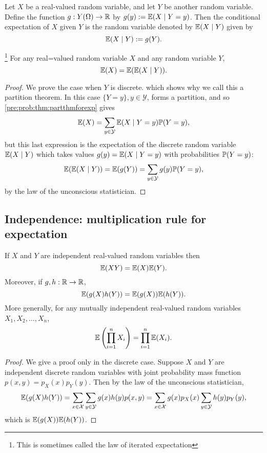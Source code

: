 \documentclass[10pt, a4paper]{article}
\begin{document}
\begin{definition}
    Let $X$ be a real-valued random variable,
    and let $Y$ be another random variable.
    Define the function $g : Y(\Omega) \rightarrow \R$ by $g(y) := \E(X\mid Y = y)$.
    Then the conditional expectation of $X$ given $Y$ is the random variable denoted by $\E(X\mid Y)$ given by
    \[
    \E(X \mid Y) := g(Y).
    \]
\end{definition}

\begin{theorem}
\footnote{This is sometimes called the law of iterated expectation}
    For any real=valued random variable $X$ and any random variable $Y$,
    \[
    \E(X) = \E(\E(X \mid Y)).
    \]
    \begin{proof}
        We prove the case when $Y$ is discrete.
        which shows why we call this a partition theorem.
        In this case $\{Y = y\}, y \in \mathcal{Y}$,
        forms a partition,
        and so \autoref{pre:prob:thm:partthmforexp} gives
        \[
        \E(X) = \sum_{y \in \mathcal{Y}}\E(X\mid Y = y)\P(Y = y),
        \]
        but this last expression is the expectation of the discrete random variable $\E(X\mid Y)$ which takes values $g(y) = \E(X\mid Y = y)$ with probabilities $\P(Y = y)$:
        \[
        \E(\E(X \mid Y)) = \E(g(Y)) = \sum_{y \in \mathcal{Y}}g(y)\P(Y = y),
        \]
        by the law of the unconscious statistician.
    \end{proof}
\end{theorem}

\subsection{Independence: multiplication rule for expectation}
\begin{theorem}\label{pre:prob:thm:expindepmeansmult}
    If $X$ and $Y$ are independent real-valued random variables then
    \[
    \E(XY) = \E(X)\E(Y).
    \]
    Moreover, if $g, h : \R \rightarrow \R$,
    \[
    \E(g(X)h(Y)) = \E(g(X))\E(h(Y)).
    \]
    More generally,
    for any mutually independent real-valued random variables $X_1, X_2, \dotsc, X_n$,
    \[
    \E\left(\prod_{i = 1}^{n}X_i\right) = \prod_{i = 1}^{n}\E(X_i).
    \]
    \begin{proof}
        We give a proof only in the discrete case.
        Suppose $X$ and $Y$ are independent discrete random variables with joint probability mass function $p(x, y) = p_X(x)p_Y(y)$.
        Then by the law of the unconscious statistician,
        \[
        \E(g(X)h(Y)) = \sum_{x \in \mathcal{X}}\sum_{y \in \mathcal{Y}}g(x)h(y)p(x, y) = \sum_{x \in \mathcal{X}}g(x)p_X(x)\sum_{y \in \mathcal{Y}}h(y)p_Y(y),
        \]
        which is $\E(g(X))\E(h(Y))$.
    \end{proof}
\end{theorem}
\end{document}
